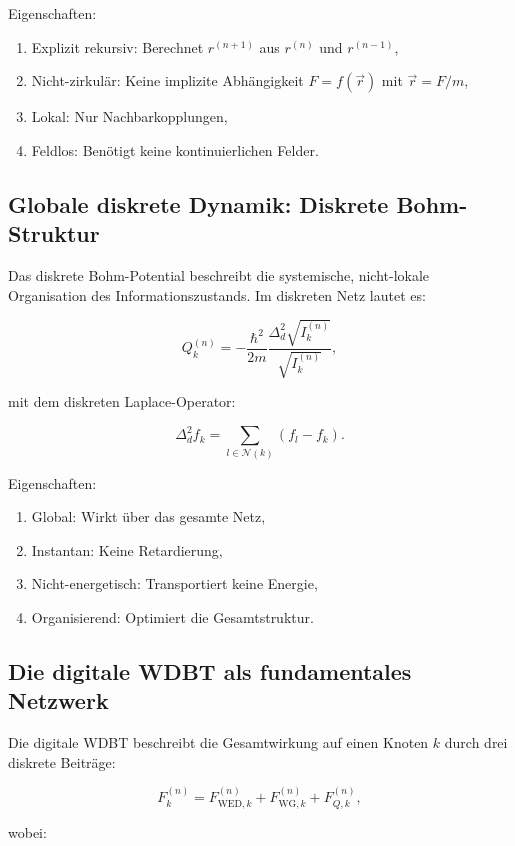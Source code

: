 Eigenschaften:

\begin{enumerate}
    \item Explizit rekursiv: Berechnet \( r^{(n+1)} \) aus \( r^{(n)} \) und \( r^{(n-1)} \),
    \item Nicht-zirkulär: Keine implizite Abhängigkeit \( F = f(\vec{r}) \) mit \( \vec{r} = F/m \),
    \item Lokal: Nur Nachbarkopplungen,
    \item Feldlos: Benötigt keine kontinuierlichen Felder.
\end{enumerate}

\subsection{Globale diskrete Dynamik: Diskrete Bohm-Struktur}
\label{sub:diskrete_bohm_struktur}

Das diskrete Bohm-Potential beschreibt die systemische, nicht-lokale Organisation des Informationszustands. Im diskreten Netz lautet es:

\[
Q_k^{(n)} = -\frac{\hbar^2}{2m} \frac{\Delta_d^2 \sqrt{I_k^{(n)}}}{\sqrt{I_k^{(n)}}},
\]

mit dem diskreten Laplace-Operator:

\[
\Delta_d^2 f_k = \sum_{l \in \mathcal{N}(k)} (f_l - f_k).
\]

Eigenschaften:

\begin{enumerate}
    \item Global: Wirkt über das gesamte Netz,
    \item Instantan: Keine Retardierung,
    \item Nicht-energetisch: Transportiert keine Energie,
    \item Organisierend: Optimiert die Gesamtstruktur.
\end{enumerate}

\subsection{Die digitale WDBT als fundamentales Netzwerk}
\label{sub:digitale_wdbt}

Die digitale WDBT beschreibt die Gesamtwirkung auf einen Knoten \( k \) durch drei diskrete Beiträge:

\[
F_k^{(n)} = F_{\text{WED},k}^{(n)} + F_{\text{WG},k}^{(n)} + F_{Q,k}^{(n)},
\]

wobei:

